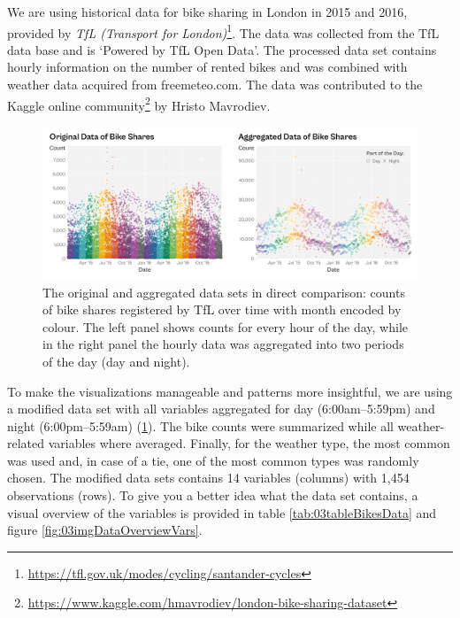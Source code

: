 \documentclass[
]{krantz}
\renewcommand{\href}[2]{#2\footnote{\url{#1}}}
\begin{document}
We are using historical data for bike sharing in London in 2015 and 2016, provided by \href{https://tfl.gov.uk/modes/cycling/santander-cycles}{\emph{TfL (Transport for London)}}. The data was collected from the TfL data base and is `Powered by TfL Open Data'. The processed data set contains hourly information on the number of rented bikes and was combined with weather data acquired from freemeteo.com. The data was contributed to the \href{https://www.kaggle.com/hmavrodiev/london-bike-sharing-dataset}{Kaggle online community} by Hristo Mavrodiev.

\begin{figure}
\centering
\includegraphics{./img/setup-data-comparison-raw-aggregated.png}
\caption{\label{fig:03imgDataComparison}The original and aggregated data sets in direct comparison: counts of bike shares registered by TfL over time with month encoded by colour. The left panel shows counts for every hour of the day, while in the right panel the hourly data was aggregated into two periods of the day (day and night).}
\end{figure}

To make the visualizations manageable and patterns more insightful, we are using a modified data set with all variables aggregated for day (6:00am--5:59pm) and night (6:00pm--5:59am) (\ref{fig:03imgDataComparison}). The bike counts were summarized while all weather-related variables where averaged. Finally, for the weather type, the most common was used and, in case of a tie, one of the most common types was randomly chosen. The modified data sets contains 14 variables (columns) with 1,454 observations (rows). To give you a better idea what the data set contains, a visual overview of the variables is provided in table \ref{tab:03tableBikesData} and figure \ref{fig:03imgDataOverviewVars}.
\end{document}
